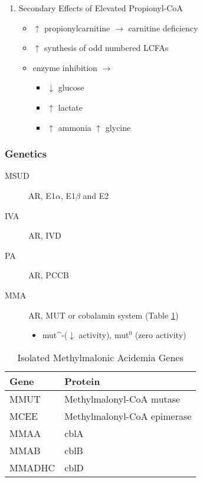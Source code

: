 \documentclass{scrartcl}
\begin{document}
\begin{enumerate}
\item Secondary Effects of Elevated Propionyl-CoA
\label{sec:org0b2dad8}
\begin{itemize}
\item \(\uparrow\) propionylcarnitine \(\to\) carnitine deficiency
\item \(\uparrow\) synthesis of odd numbered LCFAs
\item enzyme inhibition \(\to\)
\begin{itemize}
\item \(\downarrow\) glucose
\item \(\uparrow\) lactate
\item \(\uparrow\) ammonia
\(\uparrow\) glycine
\end{itemize}
\end{itemize}
\end{enumerate}

\subsubsection{Genetics}
\label{sec:org4173830}
\begin{description}
\item[{MSUD}] AR, E1\(\alpha\), E1\(\beta\) and E2
\item[{IVA}] AR, IVD
\item[{PA}] AR, PCCB
\item[{MMA}] AR, MUT or cobalamin system (Table \ref{tab:org4e3eac5})
\begin{itemize}
\item mut\^{}-(\(\downarrow\) activity), mut\(^{\text{0}}\) (zero activity)
\end{itemize}
\end{description}

\begin{table}[htbp]
\caption{\label{tab:org4e3eac5}
Isolated Methylmalonic Acidemia Genes}
\centering
\begin{tabular}{ll}
Gene\footnotemark & Protein\\
\hline
MMUT & Methylmalonyl-CoA mutase\\
MCEE & Methylmalonyl-CoA epimerase\\
MMAA & cblA\\
MMAB & cblB\\
MMADHC & cblD\\
\end{tabular}
\end{table}
\end{document}
